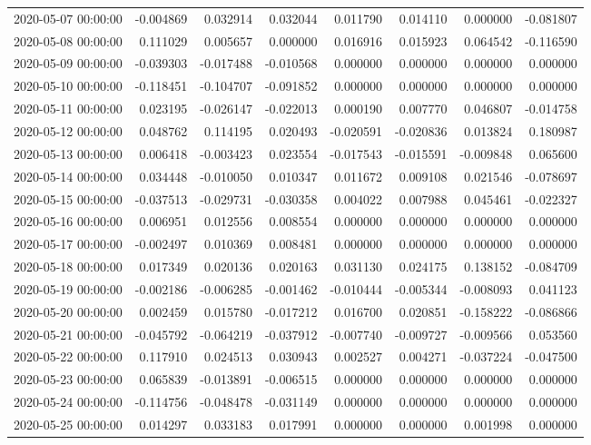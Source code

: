 \begin{tabular}{lrrrrrrr}
2020-05-07 00:00:00 & -0.004869 & 0.032914 & 0.032044 & 0.011790 & 0.014110 & 0.000000 & -0.081807 \\
2020-05-08 00:00:00 & 0.111029 & 0.005657 & 0.000000 & 0.016916 & 0.015923 & 0.064542 & -0.116590 \\
2020-05-09 00:00:00 & -0.039303 & -0.017488 & -0.010568 & 0.000000 & 0.000000 & 0.000000 & 0.000000 \\
2020-05-10 00:00:00 & -0.118451 & -0.104707 & -0.091852 & 0.000000 & 0.000000 & 0.000000 & 0.000000 \\
2020-05-11 00:00:00 & 0.023195 & -0.026147 & -0.022013 & 0.000190 & 0.007770 & 0.046807 & -0.014758 \\
2020-05-12 00:00:00 & 0.048762 & 0.114195 & 0.020493 & -0.020591 & -0.020836 & 0.013824 & 0.180987 \\
2020-05-13 00:00:00 & 0.006418 & -0.003423 & 0.023554 & -0.017543 & -0.015591 & -0.009848 & 0.065600 \\
2020-05-14 00:00:00 & 0.034448 & -0.010050 & 0.010347 & 0.011672 & 0.009108 & 0.021546 & -0.078697 \\
2020-05-15 00:00:00 & -0.037513 & -0.029731 & -0.030358 & 0.004022 & 0.007988 & 0.045461 & -0.022327 \\
2020-05-16 00:00:00 & 0.006951 & 0.012556 & 0.008554 & 0.000000 & 0.000000 & 0.000000 & 0.000000 \\
2020-05-17 00:00:00 & -0.002497 & 0.010369 & 0.008481 & 0.000000 & 0.000000 & 0.000000 & 0.000000 \\
2020-05-18 00:00:00 & 0.017349 & 0.020136 & 0.020163 & 0.031130 & 0.024175 & 0.138152 & -0.084709 \\
2020-05-19 00:00:00 & -0.002186 & -0.006285 & -0.001462 & -0.010444 & -0.005344 & -0.008093 & 0.041123 \\
2020-05-20 00:00:00 & 0.002459 & 0.015780 & -0.017212 & 0.016700 & 0.020851 & -0.158222 & -0.086866 \\
2020-05-21 00:00:00 & -0.045792 & -0.064219 & -0.037912 & -0.007740 & -0.009727 & -0.009566 & 0.053560 \\
2020-05-22 00:00:00 & 0.117910 & 0.024513 & 0.030943 & 0.002527 & 0.004271 & -0.037224 & -0.047500 \\
2020-05-23 00:00:00 & 0.065839 & -0.013891 & -0.006515 & 0.000000 & 0.000000 & 0.000000 & 0.000000 \\
2020-05-24 00:00:00 & -0.114756 & -0.048478 & -0.031149 & 0.000000 & 0.000000 & 0.000000 & 0.000000 \\
2020-05-25 00:00:00 & 0.014297 & 0.033183 & 0.017991 & 0.000000 & 0.000000 & 0.001998 & 0.000000 \\

\end{tabular}
